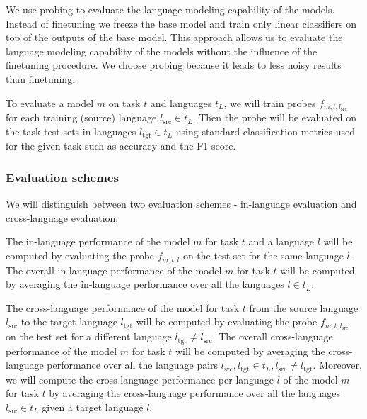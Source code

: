 We use probing \cite{conneau_what_2018,belinkov_interpretability_2020,blevins_analyzing_2022} to evaluate the language modeling capability of the models. Instead of finetuning we freeze the base model and train only linear classifiers on top of the outputs of the base model. This approach allows us to evaluate the language modeling capability of the models without the influence of the finetuning procedure. We choose probing because it leads to less noisy results than finetuning. 


To evaluate a model $m$ on task $t$ and languages $t_L$, we will train probes $f_{m, t, l_\mathrm{src}}$ for each training (source) language $l_\mathrm{src} \in t_L$. Then the probe will be evaluated on the task test sets in languages $l_\mathrm{tgt} \in t_L$ using standard classification metrics used for the given task such as accuracy and the F1 score.


\subsubsection{Evaluation schemes}

We will distinguish between two evaluation schemes - in-language evaluation and cross-language  evaluation. 

The in-language performance of the model $m$ for task $t$ and a language $l$ will be computed by evaluating the probe $f_{m, t, l}$ on the test set for the same language $l$. 
The overall in-language performance of the model $m$ for task $t$ will be computed by averaging the in-language performance over all the languages $l \in t_L$. 

The cross-language performance of the model for task $t$ from the source language $l_\mathrm{src}$ to the target language $l_\mathrm{tgt}$ will be computed by evaluating the probe $f_{m, t, l_\mathrm{src}}$ on the test set for a different language $l_\mathrm{tgt} \neq l_\mathrm{src}$. 
The overall cross-language performance of the model $m$ for task $t$ will be computed by averaging the cross-language performance over all the language pairs $l_\mathrm{src}, l_\mathrm{tgt} \in t_L, l_\mathrm{src} \neq l_\mathrm{tgt}$.
Moreover, we will compute the cross-language performance per language $l$ of the model $m$ for task $t$ by averaging the cross-language performance over all the languages $l_\mathrm{src} \in t_L$ given a target language $l$.

